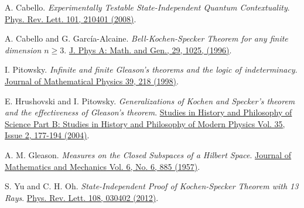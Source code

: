 \documentclass[twocolumn, a4paper, superscriptaddress,nofootinbib, accepted=2020-08-07, hyperref]{quantumarticle}
\def\textbf#1{{\bf #1}}
\begin{document}
\begin{thebibliography}{99}
A. Cabello.
\textit{Experimentally Testable State-Independent Quantum Contextuality}.
\href{https://doi.org/10.1103/PhysRevLett.101.210401}{Phys. Rev. Lett. 101, 210401 (2008)}.



A. Cabello and G. Garc\'{i}a-Alcaine.
\textit{Bell-Kochen-Specker Theorem for any finite dimension $n \geq 3$}. 
\href{https://doi.org/10.1088/0305-4470/29/5/016}{J. Phys A: Math. and Gen., 29, 1025, (1996)}.  


I. Pitowsky.
\textit{Infinite and finite Gleason's theorems and the logic of indeterminacy}.
\href{https://doi.org/10.1063/1.532334}{Journal of Mathematical Physics 39, 218 (1998)}.

E. Hrushovski and I. Pitowsky.
\textit{Generalizations of Kochen and Specker's theorem and the effectiveness of Gleason's theorem}.
\href{https://doi.org/10.1016/j.shpsb.2003.10.002}{Studies in History and Philosophy of Science Part B: Studies in History and Philosophy of Modern Physics Vol. 35, Issue 2, 177-194 (2004)}.

A. M. Gleason. 
\textit{Measures on the Closed Subspaces of a Hilbert Space}.
\href{https://www.jstor.org/stable/24900629}{Journal of Mathematics and Mechanics Vol. 6, No. 6, 885 (1957)}.

S. Yu and C. H. Oh.
\textit{State-Independent Proof of Kochen-Specker Theorem with 13 Rays}.
\href{https://doi.org/10.1103/PhysRevLett.108.030402}{Phys. Rev. Lett. 108, 030402 (2012)}.




\end{thebibliography}
\end{document}
